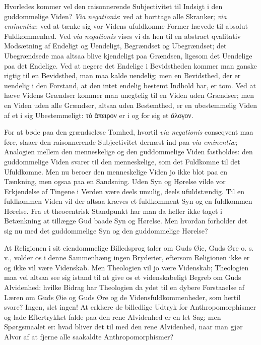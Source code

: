 \documentclass[11pt]{book}
\newcommand{\opage}[1]{\marginnote{\footnotesize\textit{[#1]}}}
\begin{document}
Hvorledes kommer vel den raisonnerende Subjectivitet til Indsigt i
den guddommelige Viden? \textit{Via negationis}: ved at borttage
alle Skranker; \textit{via eminentiæ}: ved at tænke sig vor Videns
ufuldkomne Former hævede til absolut Fuldkommenhed. Ved \textit{via
negationis} vises vi da hen til en abstract qvalitativ Modsætning af
Endeligt og Uendeligt, Begrændset og Ubegrændset; det Ubegrændsede
maa altsaa blive kjendeligt paa Grændsen, ligesom det Uendelige paa
det Endelige. Ved at negere det Endelige i Bevidstheden kommer man
ganske rigtig til en Bevidsthed, man maa kalde uendelig; men en
Bevidsthed, der er uendelig i den Forstand, at den intet endelig
bestemt Indhold har, er tom. Ved at hæve Videns Grændser kommer man
unegtelig til en Viden uden Grændser; men en Viden uden alle
Grændser, altsaa uden Bestemthed,
\opage{44} \setcounter{footnote}{0}%
er en ubestemmelig Viden af et i sig Ubestemmeligt: τὸ ἄπειρον er i
og for sig et ἄλογον.

For at bøde paa den grændseløse Tomhed, hvortil \textit{via
negationis} conseqvent maa føre, slaaer den raisonnerende
Subjectivitet dernæst ind paa \textit{via eminentiæ}; Analogien
mellem den menneskelige og den guddommelige Viden fastholdes: den
guddommelige Viden svarer til den menneskelige, som det Fuldkomne
til det Ufuldkomne. Men nu beroer den menneskelige Viden jo ikke
blot paa en Tænkning, men ogsaa paa en Sandsning. Uden Syn og
Hørelse vilde vor Erkjendelse af Tingene i Verden være deels umulig,
deels ufuldstændig. Til en fuldkommen Viden vil der altsaa kræves et
fuldkomment Syn og en fuldkommen Hørelse. Fra et theocentrisk
Standpunkt har man da heller ikke taget i Betænkning at tillægge Gud
baade Syn og Hørelse. Men hvordan forholder det sig nu med det
guddommelige Syn og den guddommelige Hørelse?

At Religionen i sit eiendommelige Billedsprog taler om Guds Øie,
Guds Øre o. s. v., volder os i denne Sammenhæng ingen Bryderier,
eftersom Religionen ikke er og ikke vil være Videnskab. Men
Theologien vil jo være Videnskab; Theologien maa vel altsaa see sig
istand til at give os et videnskabeligt Begreb om Guds Alvidenhed:
hvilke Bidrag har Theologien da ydet til en dybere Forstaaelse af
Læren om Guds Øie og Guds Øre og de Vidensfuldkommenheder, som
hertil svare? Ingen, slet ingen! At erklære de billedlige Udtryk for
Anthropomorphismer og lade Eftertrykket falde paa den rene
Alvidenhed er en let Sag; men Spørgsmaalet er: hvad bliver det til
med den rene Alvidenhed, naar man gjør Alvor af at fjerne alle
saakaldte Anthropomorphismer?
\end{document}
